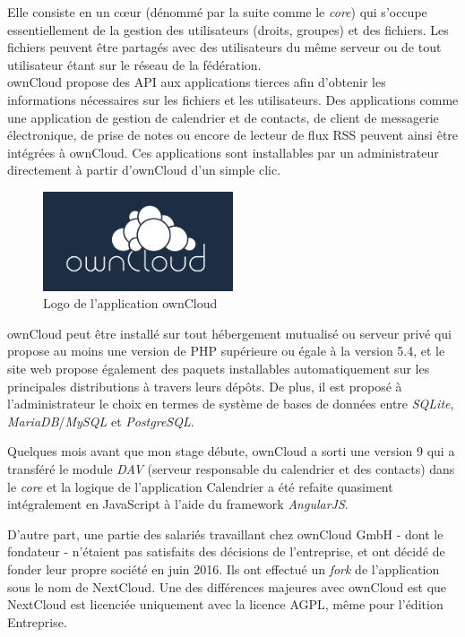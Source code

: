 \documentclass[10pt,a4paper, twoside]{report}
\begin{document}
	Elle consiste en un cœur (dénommé par la suite comme le \textit{core}) qui s'occupe essentiellement de la gestion des utilisateurs (droits, groupes) et des fichiers. Les fichiers peuvent être partagés avec des utilisateurs du même serveur ou de tout utilisateur étant sur le réseau de la fédération.
	\\
	
	ownCloud propose des API aux applications tierces afin d'obtenir les informations nécessaires sur les fichiers et les utilisateurs. Des applications comme une application de gestion de calendrier et de contacts, de client de messagerie électronique, de prise de notes ou encore de lecteur de flux RSS peuvent ainsi être intégrées à ownCloud.
	Ces applications sont installables par un administrateur directement à partir d'ownCloud d'un simple clic.
	
	\begin{figure}[ht]
		\centering
		\includegraphics[width=0.5\textwidth]{images/owncloud-logo.png}
		\caption{Logo de l'application ownCloud}
		\label{normal_case}
	\end{figure}
	
	ownCloud peut être installé sur tout hébergement mutualisé ou serveur privé qui propose au moins une version de PHP supérieure ou égale à la version 5.4, et le site web propose également des paquets installables automatiquement sur les principales distributions à travers leurs dépôts. De plus, il est proposé à l'administrateur le choix en termes de système de bases de données entre \textit{SQLite}, \textit{MariaDB}/\textit{MySQL} et \textit{PostgreSQL}.
	
	Quelques mois avant que mon stage débute, ownCloud a sorti une version 9 qui a transféré le module \textit{DAV} (serveur responsable du calendrier et des contacts) dans le \textit{core} et la logique de l'application Calendrier a été refaite quasiment intégralement en JavaScript à l'aide du framework \textit{AngularJS}.
	
	D'autre part, une partie des salariés travaillant chez ownCloud GmbH - dont le fondateur - n'étaient pas satisfaits des décisions de l'entreprise, et ont décidé de fonder leur propre société en juin 2016. Ils ont effectué un \textit{fork} de l'application sous le nom de NextCloud. Une des différences majeures avec ownCloud est que NextCloud est licenciée uniquement avec la licence AGPL, même pour l'édition Entreprise. 
	
\end{document}
